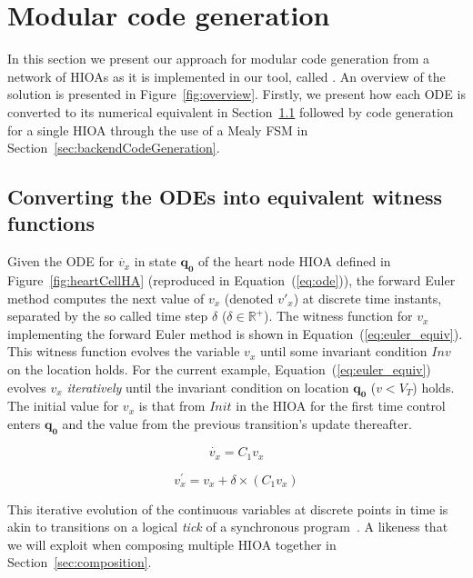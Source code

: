 \section{Modular code generation}
\label{sec:codeGen}

In this section we present our approach for modular code generation from
a network of \acp{HIOA} as it is implemented in our tool, called
\ourTool.  An overview of the solution is presented in 
Figure~\ref{fig:overview}. Firstly, we present how each \ac{ODE} is converted 
to its numerical equivalent in Section~\ref{sec:converting-odes-into} followed 
by code generation for a single \ac{HIOA} through the use of a Mealy \ac{FSM} 
in Section~\ref{sec:backendCodeGeneration}.

\subsection{Converting the \acp{ODE} into equivalent witness functions}
\label{sec:converting-odes-into}

Given the \ac{ODE} for $\dot{v_x}$ in state $\mathbf{q_0}$ of the heart
node \ac{HIOA} defined in Figure~\ref{fig:heartCellHA} (reproduced in
Equation~(\ref{eq:ode})), the forward Euler method computes the next
value of $v_{x}$ (denoted $v'_{x}$) at discrete time instants, separated
by the so called time step $\delta$
($\delta \in \mathbb{R}^{+}$). The witness function for $v_{x}$
implementing the forward Euler method is shown in
Equation~(\ref{eq:euler_equiv}). This witness function evolves the
variable $v_{x}$ until some invariant condition $Inv$ on the location
holds. For the current example, Equation~(\ref{eq:euler_equiv}) evolves
$v_{x}$ \emph{iteratively} until the invariant condition on location
$\mathbf{q_{0}}$ ($v < V_{T}$) holds.  The initial value for $v_{x}$ is that 
from $Init$ in the \ac{HIOA} for the first time control enters $\mathbf{q_0}$ 
and the value from the previous transition's update thereafter.


\begin{equation}
  \dot{v_x} = C_{1} v_x
  \label{eq:ode}
\end{equation}

\begin{equation}
  v^\prime_x = v_x + \delta \times (C_{1} v_x)
  \label{eq:euler_equiv}
\end{equation}


This iterative evolution of the continuous variables at discrete points
in time is akin to transitions on a logical \emph{tick} of a
synchronous program~\cite{benveniste03}. A likeness that we will exploit when 
composing multiple \ac{HIOA} together in Section~\ref{sec:composition}.


